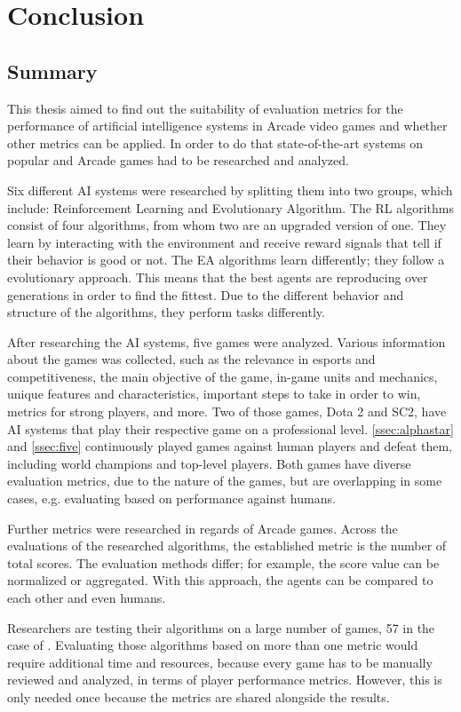 \chapter{Conclusion}
\section{Summary}
This thesis aimed to find out the suitability of evaluation metrics for the performance of artificial intelligence systems in Arcade video games and whether other metrics can be applied. In order to do that state-of-the-art systems on popular and Arcade games had to be researched and analyzed.

Six different AI systems were researched by splitting them into two groups, which include: Reinforcement Learning and Evolutionary Algorithm. The RL algorithms consist of four algorithms, from whom two are an upgraded version of one. They learn by interacting with the environment and receive reward signals that tell if their behavior is good or not. The EA algorithms learn differently; they follow a evolutionary approach. This means that the best agents are reproducing over generations in order to find the fittest. Due to the different behavior and structure of the algorithms, they perform tasks differently.

After researching the AI systems, five games were analyzed. Various information about the games was collected, such as the relevance in esports and competitiveness, the main objective of the game, in-game units and mechanics, unique features and characteristics, important steps to take in order to win, metrics for strong players, and more. Two of those games, Dota 2 and SC2, have AI systems that play their respective game on a professional level. \ref{ssec:alphastar} and \ref{ssec:five} continuously played games against human players and defeat them, including world champions and top-level players. Both games have diverse evaluation metrics, due to the nature of the games, but are overlapping in some cases, e.g. evaluating based on performance against humans. 

Further metrics were researched in regards of Arcade games. Across the evaluations of the researched algorithms, the established metric is the number of total scores. The evaluation methods differ; for example, the score value can be normalized or aggregated. With this approach, the agents can be compared to each other and even humans. 

Researchers are testing their algorithms on a large number of games, 57 in the case of \cite{2018arXiv180300933H}. Evaluating those algorithms based on more than one metric would require additional time and resources, because every game has to be manually reviewed and analyzed, in terms of player performance metrics. However, this is only needed once because the metrics are shared alongside the results.

